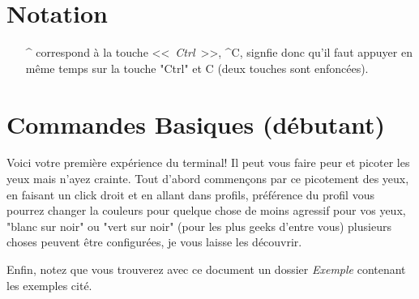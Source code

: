 \documentclass[french, a4paper, 12pt, titlepage]{article}
\begin{document}
\section{Notation}
\begin{enumerate}
\item[\^{}] correspond à la touche <<~\emph{Ctrl}~>>, \^{}C, signfie donc qu'il faut appuyer en même temps sur la touche "Ctrl" et C (deux touches sont enfoncées).
\end{enumerate}

\section{Commandes Basiques (débutant)}
Voici votre première expérience du terminal!
Il peut vous faire peur et picoter les yeux mais n'ayez crainte. Tout d'abord commençons par ce picotement des yeux, en faisant un click droit et en allant dans profils, préférence du profil vous pourrez changer la couleurs pour quelque chose de moins agressif pour vos yeux, "blanc sur noir" ou "vert sur noir" (pour les plus geeks d'entre vous) plusieurs choses peuvent être configurées, je vous laisse les découvrir.

Enfin, notez que vous trouverez avec ce document un dossier \emph{Exemple} contenant les exemples cité.
\end{document}
